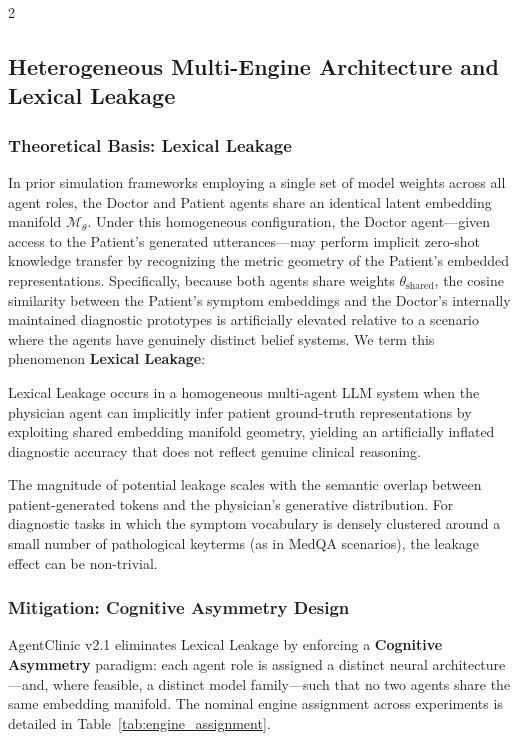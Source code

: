 \documentclass[10pt, a4paper]{article}
\begin{document}
\begin{multicols}{2}
\subsection{Heterogeneous Multi-Engine Architecture and Lexical Leakage}
\label{ssec:heterogeneous}

\subsubsection{Theoretical Basis: Lexical Leakage}

In prior simulation frameworks employing a single set of model weights across all agent roles, the Doctor and Patient agents share an identical latent embedding manifold $\mathcal{M}_\theta$. Under this homogeneous configuration, the Doctor agent—given access to the Patient's generated utterances—may perform implicit zero-shot knowledge transfer by recognizing the metric geometry of the Patient's embedded representations. Specifically, because both agents share weights $\theta_{\text{shared}}$, the cosine similarity between the Patient's symptom embeddings and the Doctor's internally maintained diagnostic prototypes is artificially elevated relative to a scenario where the agents have genuinely distinct belief systems. We term this phenomenon \textbf{Lexical Leakage}:

\begin{definition}
Lexical Leakage occurs in a homogeneous multi-agent LLM system when the physician agent can implicitly infer patient ground-truth representations by exploiting shared embedding manifold geometry, yielding an artificially inflated diagnostic accuracy that does not reflect genuine clinical reasoning.
\end{definition}

The magnitude of potential leakage scales with the semantic overlap between patient-generated tokens and the physician's generative distribution. For diagnostic tasks in which the symptom vocabulary is densely clustered around a small number of pathological keyterms (as in MedQA scenarios), the leakage effect can be non-trivial.

\subsubsection{Mitigation: Cognitive Asymmetry Design}

AgentClinic v2.1 eliminates Lexical Leakage by enforcing a \textbf{Cognitive Asymmetry} paradigm: each agent role is assigned a distinct neural architecture—and, where feasible, a distinct model family—such that no two agents share the same embedding manifold. The nominal engine assignment across experiments is detailed in Table~\ref{tab:engine_assignment}.


\end{multicols}
\end{document}
